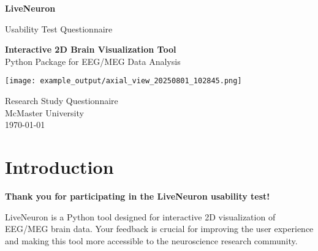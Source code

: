 \documentclass[11pt,a4paper]{article}
\begin{document}
\begin{titlepage}
    \centering
    \vspace*{2cm}
    
    {\Huge\bfseries\color{primaryblue} LiveNeuron}
    
    \vspace{0.5cm}
    {\Large\color{darkgray} Usability Test Questionnaire}
    
    \vspace{2cm}
    
    \begin{tcolorbox}[colback=lightgray!50,colframe=primaryblue,boxrule=2pt,arc=4pt]
        \centering
        \large
        \textbf{Interactive 2D Brain Visualization Tool}\\
        \vspace{0.5cm}
        Python Package for EEG/MEG Data Analysis
    \end{tcolorbox}
    
    \vspace{3cm}
    
    \begin{center}
        \texttt{[image: example\_output/axial\_view\_20250801\_102845.png]}
    \end{center}
    
    \vspace{2cm}
    
    {\large Research Study Questionnaire}\\
    \vspace{0.5cm}
    {\normalsize McMaster University}\\
    {\normalsize \today}
    
\end{titlepage}

\newpage

\section*{Introduction}

\begin{tcolorbox}[colback=primaryblue!10,colframe=primaryblue,boxrule=1pt,arc=2pt]
    \textbf{Thank you for participating in the LiveNeuron usability test!}
    
    LiveNeuron is a Python tool designed for interactive 2D visualization of EEG/MEG brain data. Your feedback is crucial for improving the user experience and making this tool more accessible to the neuroscience research community.
\end{tcolorbox}
\end{document}
